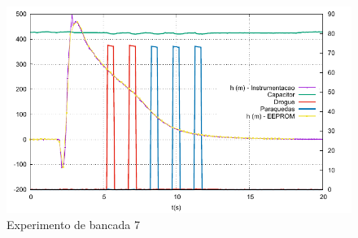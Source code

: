 \documentclass[12pt,a4paper]{article}
\begin{document}
\begin{figure}[!ht]
	\centering
	\includegraphics[width=\textwidth]{./data/exp-v1.5.5/exp07/fig}
	\caption{Experimento de bancada  7}
	\label{fig:exp07}
\end{figure}
\end{document}
